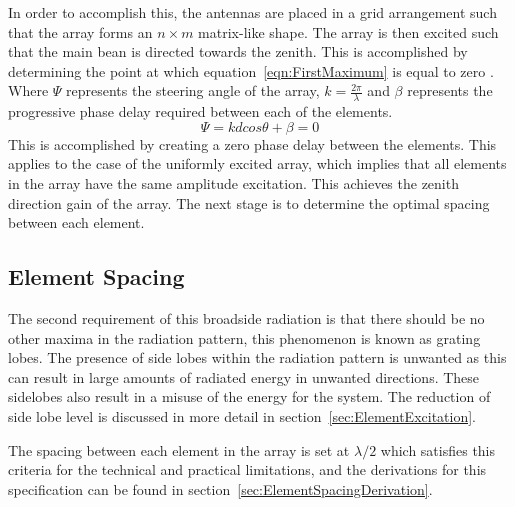 \documentclass[11pt]{witseiepaper}
\begin{document}
\begin{bibunit}[witseie]
In order to accomplish this, the antennas are placed in a grid arrangement such that the array forms an $n \times m$ matrix-like shape.
The array is then excited such that the main bean is directed towards the zenith. This is accomplished by determining the point at which equation~\ref{eqn:FirstMaximum} is equal to zero \cite[p.~296]{Balanis}. Where $\Psi$ represents the steering angle of the array, $k = \frac{2 \pi}{\lambda}$ and $\beta$ represents the progressive phase delay required between each of the elements.
\begin{equation} \label{eqn:FirstMaximum}
\Psi = k d cos \theta + \beta = 0
\end{equation}
This is accomplished by creating a zero phase delay between the elements. This applies to the case of the uniformly excited array, which implies that all elements in the array have the same amplitude excitation.
This achieves the zenith direction gain of the array. The next stage is to determine the optimal spacing between each element.

\subsection{Element Spacing} \label{sec:ElementSpacing}
The second requirement of this broadside radiation is that there should be no other maxima in the radiation pattern, this phenomenon is known as grating lobes. The presence of side lobes within the radiation pattern is unwanted as this can result in large amounts of radiated energy in unwanted directions. These sidelobes also result in a misuse of the energy for the system. The reduction of side lobe level is discussed in more detail in section~\ref{sec:ElementExcitation}.

The spacing between each element in the array is set at $\lambda/2$ which satisfies this criteria for the technical and practical limitations, and the derivations for this specification can be found in section~\ref{sec:ElementSpacingDerivation}.


\end{bibunit}
\end{document}
